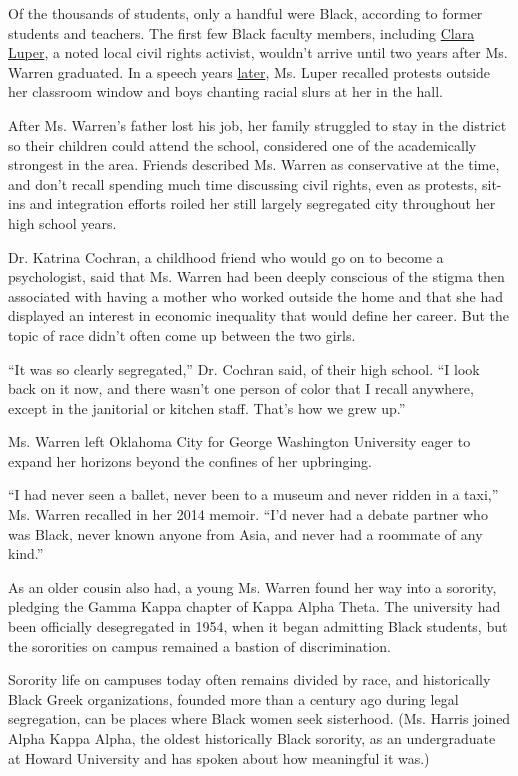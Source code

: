 Of the thousands of students, only a handful were Black, according to
former students and teachers. The first few Black faculty members,
including
\href{https://okdemocrats.org/oklahoma-black-history-heroes-clara-luper/}{Clara
Luper}, a noted local civil rights activist, wouldn't arrive until two
years after Ms. Warren graduated. In a speech years
\href{https://www.youtube.com/watch?v=dBMem0grMv8\&t=18s.}{later}, Ms.
Luper recalled protests outside her classroom window and boys chanting
racial slurs at her in the hall.

After Ms. Warren's father lost his job, her family struggled to stay in
the district so their children could attend the school, considered one
of the academically strongest in the area. Friends described Ms. Warren
as conservative at the time, and don't recall spending much time
discussing civil rights, even as protests, sit-ins and integration
efforts roiled her still largely segregated city throughout her high
school years.

Dr. Katrina Cochran, a childhood friend who would go on to become a
psychologist, said that Ms. Warren had been deeply conscious of the
stigma then associated with having a mother who worked outside the home
and that she had displayed an interest in economic inequality that would
define her career. But the topic of race didn't often come up between
the two girls.

``It was so clearly segregated,'' Dr. Cochran said, of their high
school. ``I look back on it now, and there wasn't one person of color
that I recall anywhere, except in the janitorial or kitchen staff.
That's how we grew up.''

Ms. Warren left Oklahoma City for George Washington University eager to
expand her horizons beyond the confines of her upbringing.

``I had never seen a ballet, never been to a museum and never ridden in
a taxi,'' Ms. Warren recalled in her 2014 memoir. ``I'd never had a
debate partner who was Black, never known anyone from Asia, and never
had a roommate of any kind.''

As an older cousin also had, a young Ms. Warren found her way into a
sorority, pledging the Gamma Kappa chapter of Kappa Alpha Theta. The
university had been officially desegregated in 1954, when it began
admitting Black students, but the sororities on campus remained a
bastion of discrimination.

Sorority life on campuses today often remains divided by race, and
historically Black Greek organizations, founded more than a century ago
during legal segregation, can be places where Black women seek
sisterhood. (Ms. Harris joined Alpha Kappa Alpha, the oldest
historically Black sorority, as an undergraduate at Howard University
and has spoken about how meaningful it was.)

